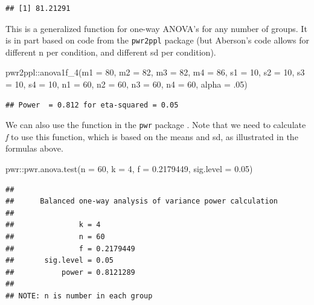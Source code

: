 \documentclass[
]{book}
\newenvironment{Shaded}{\begin{snugshade}}{\end{snugshade}}
\newcommand{\AttributeTok}[1]{\textcolor[rgb]{0.77,0.63,0.00}{#1}}
\newcommand{\DecValTok}[1]{\textcolor[rgb]{0.00,0.00,0.81}{#1}}
\newcommand{\FloatTok}[1]{\textcolor[rgb]{0.00,0.00,0.81}{#1}}
\newcommand{\FunctionTok}[1]{\textcolor[rgb]{0.00,0.00,0.00}{#1}}
\newcommand{\NormalTok}[1]{#1}
\newcommand{\SpecialCharTok}[1]{\textcolor[rgb]{0.00,0.00,0.00}{#1}}
\begin{document}
\begin{verbatim}
## [1] 81.21291
\end{verbatim}

This is a generalized function for one-way ANOVA's for any number of groups. It is in part based on code from the \texttt{pwr2ppl} \citep{R-pwr2ppl} package (but Aberson's code allows for different n per condition, and different sd per condition).

\begin{Shaded}
\begin{Highlighting}[]
\NormalTok{pwr2ppl}\SpecialCharTok{::}\FunctionTok{anova1f\_4}\NormalTok{(}\AttributeTok{m1 =} \DecValTok{80}\NormalTok{, }\AttributeTok{m2 =} \DecValTok{82}\NormalTok{, }\AttributeTok{m3 =} \DecValTok{82}\NormalTok{, }\AttributeTok{m4 =} \DecValTok{86}\NormalTok{,}
          \AttributeTok{s1 =} \DecValTok{10}\NormalTok{, }\AttributeTok{s2 =} \DecValTok{10}\NormalTok{, }\AttributeTok{s3 =} \DecValTok{10}\NormalTok{, }\AttributeTok{s4 =} \DecValTok{10}\NormalTok{,}
          \AttributeTok{n1 =} \DecValTok{60}\NormalTok{, }\AttributeTok{n2 =} \DecValTok{60}\NormalTok{, }\AttributeTok{n3 =} \DecValTok{60}\NormalTok{, }\AttributeTok{n4 =} \DecValTok{60}\NormalTok{,}
          \AttributeTok{alpha =}\NormalTok{ .}\DecValTok{05}\NormalTok{)}
\end{Highlighting}
\end{Shaded}

\begin{verbatim}
## Power  = 0.812 for eta-squared = 0.05
\end{verbatim}

We can also use the function in the \texttt{pwr} package \citep{R-pwr}. Note that we need to calculate \emph{f} to use this function, which is based on the means and sd, as illustrated in the formulas above.

\begin{Shaded}
\begin{Highlighting}[]
\NormalTok{pwr}\SpecialCharTok{::}\FunctionTok{pwr.anova.test}\NormalTok{(}\AttributeTok{n =} \DecValTok{60}\NormalTok{,}
               \AttributeTok{k =} \DecValTok{4}\NormalTok{,}
               \AttributeTok{f =} \FloatTok{0.2179449}\NormalTok{,}
               \AttributeTok{sig.level =} \FloatTok{0.05}\NormalTok{)}
\end{Highlighting}
\end{Shaded}

\begin{verbatim}
## 
##      Balanced one-way analysis of variance power calculation 
## 
##               k = 4
##               n = 60
##               f = 0.2179449
##       sig.level = 0.05
##           power = 0.8121289
## 
## NOTE: n is number in each group
\end{verbatim}
\end{document}
